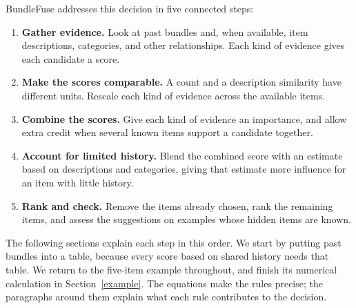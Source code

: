 \documentclass[11pt,a4paper]{article}
\numberwithin{equation}{section}
\begin{document}
BundleFuse addresses this decision in five connected steps:
\begin{enumerate}[leftmargin=*]
\item \textbf{Gather evidence.} Look at past bundles and, when available, item descriptions,
      categories, and other relationships. Each kind of evidence gives each candidate a score.
\item \textbf{Make the scores comparable.} A count and a description similarity have
      different units. Rescale each kind of evidence across the available items.
\item \textbf{Combine the scores.} Give each kind of evidence an importance, and allow
      extra credit when several known items support a candidate together.
\item \textbf{Account for limited history.} Blend the combined score with an estimate
      based on descriptions and categories, giving that estimate more influence for an item
      with little history.
\item \textbf{Rank and check.} Remove the items already chosen, rank the remaining items,
      and assess the suggestions on examples whose hidden items are known.
\end{enumerate}
The following sections explain each step in this order. We start by putting past bundles
into a table, because every score based on shared history needs that table. We return to
the five-item example throughout, and finish its numerical calculation in
Section~\ref{example}. The equations make the rules precise; the paragraphs around them
explain what each rule contributes to the decision.
\end{document}
